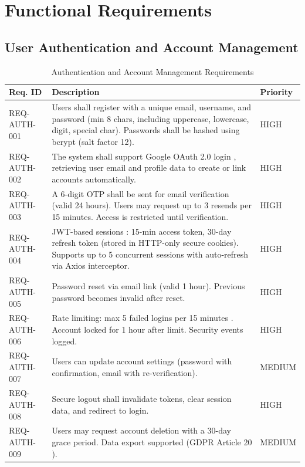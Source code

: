 \documentclass[12pt, a4paper, oneside]{report}
\begin{document}
\section{Functional Requirements}

\subsection{User Authentication and Account Management}

\begin{table}[H]
\centering
\caption{Authentication and Account Management Requirements}
\label{tab:req_auth}
\renewcommand{\arraystretch}{1.2}
\small
\begin{tabularx}{\textwidth}{|p{3cm}|X|p{2cm}|}
\hline
\textbf{Req. ID} & \textbf{Description} & \textbf{Priority} \\
\hline
REQ-AUTH-001 & Users shall register with a unique email, username, and password (min 8 chars, including uppercase, lowercase, digit, special char). Passwords shall be hashed using bcrypt \cite{bcrypt1999} (salt factor 12). & HIGH \\
\hline
REQ-AUTH-002 & The system shall support Google OAuth 2.0 login \cite{oauth2012}, retrieving user email and profile data to create or link accounts automatically. & HIGH \\
\hline
REQ-AUTH-003 & A 6-digit OTP shall be sent for email verification (valid 24 hours). Users may request up to 3 resends per 15 minutes. Access is restricted until verification. & HIGH \\
\hline
REQ-AUTH-004 & JWT-based sessions \cite{jwt2015}: 15-min access token, 30-day refresh token (stored in HTTP-only secure cookies). Supports up to 5 concurrent sessions with auto-refresh via Axios interceptor. & HIGH \\
\hline
REQ-AUTH-005 & Password reset via email link (valid 1 hour). Previous password becomes invalid after reset. & HIGH \\
\hline
REQ-AUTH-006 & Rate limiting: max 5 failed logins per 15 minutes \cite{owasp2021}. Account locked for 1 hour after limit. Security events logged. & HIGH \\
\hline
REQ-AUTH-007 & Users can update account settings (password with confirmation, email with re-verification). & MEDIUM \\
\hline
REQ-AUTH-008 & Secure logout shall invalidate tokens, clear session data, and redirect to login. & HIGH \\
\hline
REQ-AUTH-009 & Users may request account deletion with a 30-day grace period. Data export supported (GDPR Article 20 \cite{gdpr2016}). & MEDIUM \\
\hline
\end{tabularx}
\end{table}
\end{document}
